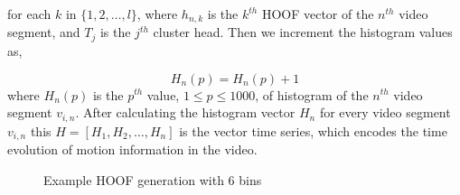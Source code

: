for each $k$ in $\{1,2,\dots, l\}$, where $h_{n,k}$ is the $k^{th}$ HOOF vector of the $n^{th}$ video segment, and $T_{j}$ is the $j^{th}$ cluster head. Then we increment the histogram values as,

\begin{equation}
H_{n}(p) = H_{n}(p)+1
\end{equation}
where $H_{n}(p)$ is the $p^{th}$ value, $1\leq p\leq 1000$, of histogram of the $n^{th}$ video segment $v_{i,n}$. After calculating the histogram vector $H_{n}$ for every video segment $v_{i,n}$
this $H = [H_{1},H_{2}, \dots, H_{n}]$ is the vector time series, which encodes the time evolution of motion information in the video.

\begin{figure}
  \centering
  
  \caption{Example HOOF generation with 6 bins}\label{fi:hoof}
\end{figure}
